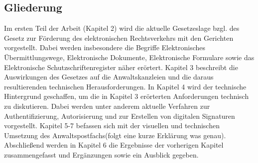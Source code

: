 \subsection*{Gliederung}
Im ersten Teil der Arbeit (Kapitel 2) wird die aktuelle Gesetzeslage bzgl. des Gesetz zur Förderung des elektronischen Rechtsverkehrs mit den Gerichten vorgestellt. Dabei werden insbesondere die Begriffe  Elektronisches Übermittlungswege, Elektronische Dokumente, Elektronische Formulare sowie das Elektronische Schutzschriftenregister näher erörtert. Kapitel 3 beschreibt die Auswirkungen des Gesetzes auf die Anwaltskanzleien und die daraus resultierenden technischen Herausforderungen. In Kapitel 4 wird der technische Hintergrund geschaffen, um die in Kapitel 3 erörterten Anforderungen technisch zu diskutieren. Dabei werden unter anderem aktuelle Verfahren zur Authentifizierung, Autorisierung und zur Erstellen von digitalen Signaturen vorgestellt. Kapitel 5-7 befassen sich mit der visuellen und technischen Umsetzung des Anwaltspostfachs(folgt eine kurze Erklärung was genau).  Abschließend werden in Kapitel 6 die Ergebnisse der vorherigen Kapitel zusammengefasst und Ergänzungen sowie ein Ausblick gegeben.

